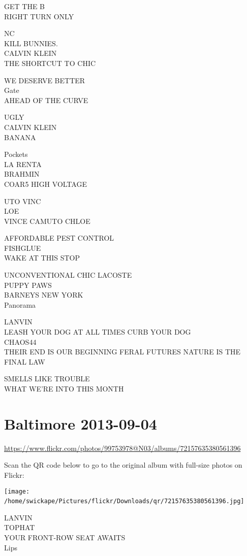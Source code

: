 \documentclass[10pt,letterpaper]{article}
\begin{document}
GET THE B\\
RIGHT TURN ONLY

NC\\
KILL BUNNIES.\\
CALVIN KLEIN\\
THE SHORTCUT TO CHIC

WE DESERVE BETTER\\
Gate\\
AHEAD OF THE CURVE

UGLY\\
CALVIN KLEIN\\
BANANA

Pockets\\
LA RENTA\\
BRAHMIN\\
COAR5 HIGH VOLTAGE

UTO VINC\\
LOE\\
VINCE CAMUTO CHLOE

AFFORDABLE PEST CONTROL\\
FISHGLUE\\
WAKE AT THIS STOP

UNCONVENTIONAL CHIC LACOSTE\\
PUPPY PAWS\\
BARNEYS NEW YORK\\
Panorama

LANVIN\\
LEASH YOUR DOG AT ALL TIMES CURB YOUR DOG\\
CHAOS44\\
THEIR END IS OUR BEGINNING FERAL FUTURES NATURE IS THE FINAL LAW

SMELLS LIKE TROUBLE\\
WHAT WE'RE INTO THIS MONTH
\

\section*{Baltimore 2013-09-04}

\url{https://www.flickr.com/photos/99753978@N03/albums/72157635380561396}

Scan the QR code below to go to the original album with full-size photos on Flickr:

\texttt{[image: /home/swickape/Pictures/flickr/Downloads/qr/72157635380561396.jpg]}
\

LANVIN\\
TOPHAT\\
YOUR FRONT{-}ROW SEAT AWAITS\\
Lips
\end{document}
